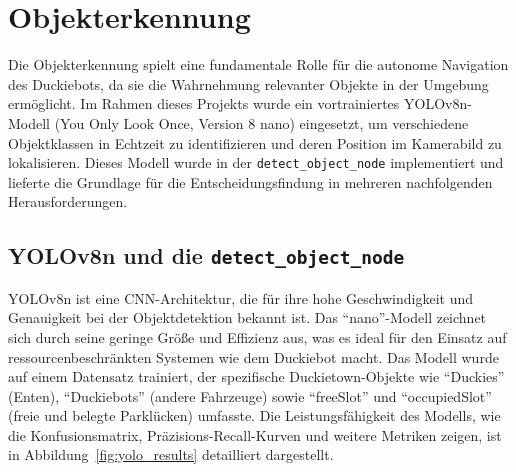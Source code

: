 \chapter{Objekterkennung}
\label{ch:Objekterkennung}

Die Objekterkennung spielt eine fundamentale Rolle für die autonome Navigation des Duckiebots, da sie die Wahrnehmung relevanter Objekte in der Umgebung ermöglicht. Im Rahmen dieses Projekts wurde ein vortrainiertes YOLOv8n-Modell (You Only Look Once, Version 8 nano) eingesetzt, um verschiedene Objektklassen in Echtzeit zu identifizieren und deren Position im Kamerabild zu lokalisieren. Dieses Modell wurde in der \texttt{detect\_object\_node} implementiert und lieferte die Grundlage für die Entscheidungsfindung in mehreren nachfolgenden Herausforderungen.

\section{YOLOv8n und die \texttt{detect\_object\_node}}

YOLOv8n ist eine \ac{CNN}-Architektur, die für ihre hohe Geschwindigkeit und Genauigkeit bei der Objektdetektion bekannt ist. Das \enquote{nano}-Modell zeichnet sich durch seine geringe Größe und Effizienz aus, was es ideal für den Einsatz auf ressourcenbeschränkten Systemen wie dem Duckiebot macht. Das Modell wurde auf einem Datensatz trainiert, der spezifische Duckietown-Objekte wie \enquote{Duckies} (Enten), \enquote{Duckiebots} (andere Fahrzeuge) sowie \enquote{freeSlot} und \enquote{occupiedSlot} (freie und belegte Parklücken) umfasste. Die Leistungsfähigkeit des Modells, wie die Konfusionsmatrix, Präzisions-Recall-Kurven und weitere Metriken zeigen, ist in Abbildung~\ref{fig:yolo_results} detailliert dargestellt.

